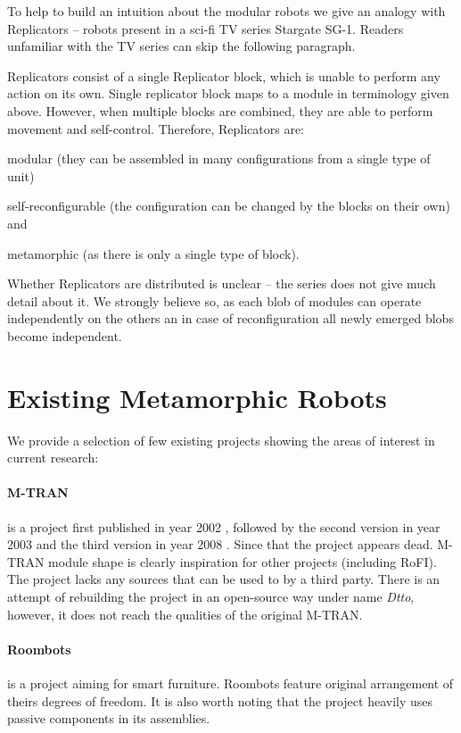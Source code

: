To help to build an intuition about the modular robots we give an analogy with
Replicators -- robots present in a sci-fi TV series Stargate
SG-1\cite{wright_stargate_1997}. Readers unfamiliar with the TV series can skip
the following paragraph.

Replicators consist of a single Replicator block, which is unable to perform any
action on its own. Single replicator block maps to a module in terminology given
above. However, when multiple blocks are combined, they are able to perform
movement and self-control. Therefore, Replicators are:
\begin{enumerate*}
    \item modular (they can be assembled in many configurations from a single
    type of unit)
    \item self-reconfigurable (the configuration can be changed by the blocks on
    their own) and
    \item metamorphic (as there is only a single type of block).
\end{enumerate*}
Whether Replicators are distributed is unclear -- the series does not give much
detail about it. We strongly believe so, as each blob of modules can operate
independently on the others an in case of reconfiguration all newly emerged
blobs become independent.

\section{Existing Metamorphic Robots}

We provide a selection of few existing projects showing the areas of interest in
current research:

\paragraph{M-TRAN} is a project first published in year 2002
\cite{murata_m-tran:_2002}, followed by the second version in year 2003
\cite{haruhisa_kurokawa_m-tran_2003} and the third version in year 2008
\cite{kurokawa_distributed_2008}. Since that the project appears dead. M-TRAN
module shape is clearly inspiration for other projects (including RoFI). The
project lacks any sources that can be used to by a third party. There is an
attempt of rebuilding the project in an open-source way under name
\emph{Dtto}\cite{noauthor_dtto_nodate}, however, it does not reach the qualities
of the original M-TRAN.

\paragraph{Roombots} \cite{bonardi_locomotion_2012} is a project aiming for
smart furniture. Roombots feature original arrangement of theirs degrees of
freedom. It is also worth noting that the project heavily uses passive
components in its assemblies.

